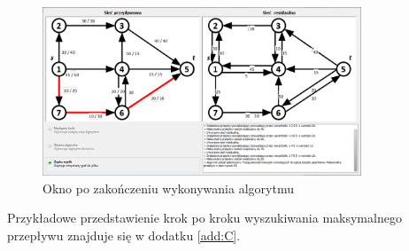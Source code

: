 \begin{figure}[H]
	\centering
	\includegraphics[width=0.85\textwidth]{./img/spec_zew06_5}
	\caption{Okno po zakończeniu wykonywania algorytmu}
	\label{fig:algorithmWindowFinished}
\end{figure}
Przykładowe przedstawienie krok po kroku wyszukiwania maksymalnego przepływu znajduje się w dodatku \ref{add:C}.
